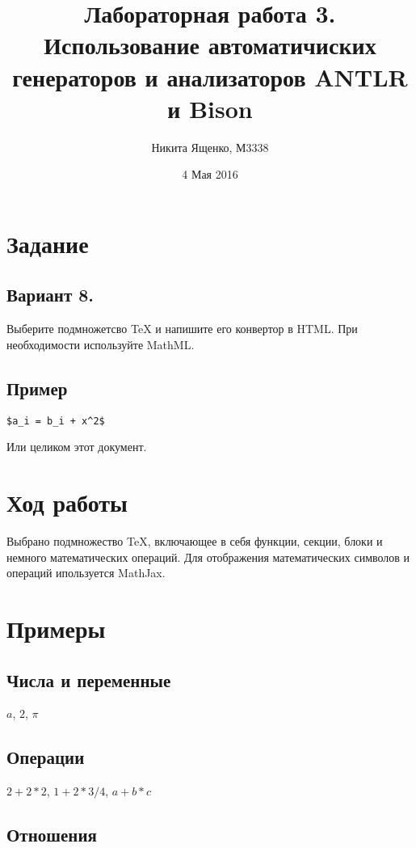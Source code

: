 \documentclass[11pt,oneside,a4paper]{article}
\title{Лабораторная работа 3. Использование автоматичиских генераторов и анализаторов ANTLR и Bison}
\author{Никита Ященко, М3338}
\date{4 Мая 2016}
\begin{document}
\maketitle

\section{Задание}
\subsection{Вариант 8.}
 
Выберите подмножетсво TeX и напишите его конвертор в HTML.
При необходимости используйте MathML.

\subsection{Пример}

\begin{verbatim}
$a_i = b_i + x^2$
\end{verbatim}

Или целиком этот документ.

\section{Ход работы}

Выбрано подмножество TeX, включающее в себя функции, секции, блоки и немного математических операций.
Для отображения математических символов и операций ипользуется MathJax.

\section{Примеры}

\subsection{Числа и переменные}

$a$, $2$, $\pi$

\subsection{Операции}

$2 + 2 * 2$, $1 + 2 * 3 / 4$, $a + b * c$
 
\subsection{Отношения}
\end{document}
